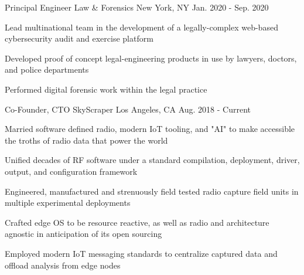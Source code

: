 

\begin{cventries}

  \cventry
    {Principal Engineer} %
    {Law \& Forensics} %
    {New York, NY} %
    {Jan. 2020 - Sep. 2020} %
    {
      \begin{cvitems} %
	      \item {Lead multinational team in the development of a legally-complex web-based cybersecurity audit and exercise platform}
          \item {Developed proof of concept legal-engineering products in use by lawyers, doctors, and police departments}
          \item {Performed digital forensic work within the legal practice}
      \end{cvitems}
    }

 \cventry
    {Co-Founder, CTO} %
    {SkyScraper} %
    {Los Angeles, CA} %
    {Aug. 2018 - Current} %
    {
      \begin{cvitems} %
	      \item {Married software defined radio, modern IoT tooling, and "AI" to make accessible the  troths of radio data that power the world}
	      \item {Unified decades of RF software under a standard compilation, deployment, driver, output, and configuration framework}
	      \item {Engineered, manufactured and strenuously field tested  radio capture field units in multiple experimental deployments}
	      \item {Crafted edge OS to be resource reactive, as well as radio and architecture agnostic in anticipation of its open sourcing}
	      \item {Employed modern IoT messaging standards to centralize captured data and offload analysis from edge nodes}
      \end{cvitems}
    }


\end{cventries}
